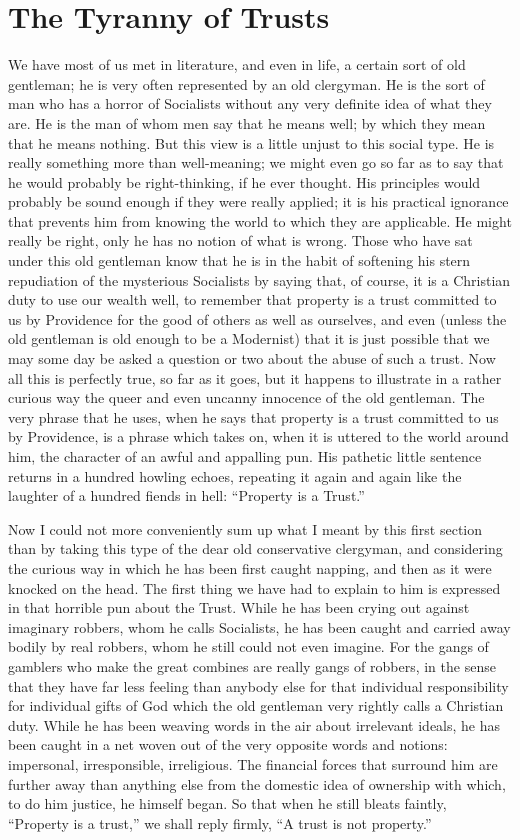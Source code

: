 \documentclass{book}
\begin{document}
\chapter{The Tyranny of Trusts}
\label{chapter-9}
We have most of us met in literature, and even in life, a certain sort of old gentleman; he is very often represented by an old clergyman. He is the sort of man who has a horror of Socialists without any very definite idea of what they are. He is the man of whom men say that he means well; by which they mean that he means nothing. But this view is a little unjust to this social type. He is really something more than well-meaning; we might even go so far as to say that he would probably be right-thinking, if he ever thought. His principles would probably be sound enough if they were really applied; it is his practical ignorance that prevents him from knowing the world to which they are applicable. He might really be right, only he has no notion of what is wrong. Those who have sat under this old gentleman know that he is in the habit of softening his stern repudiation of the mysterious Socialists by saying that, of course, it is a Christian duty to use our wealth well, to remember that property is a trust committed to us by Providence for the good of others as well as ourselves, and even (unless the old gentleman is old enough to be a Modernist) that it is just possible that we may some day be asked a question or two about the abuse of such a trust. Now all this is perfectly true, so far as it goes, but it happens to illustrate in a rather curious way the queer and even uncanny innocence of the old gentleman. The very phrase that he uses, when he says that property is a trust committed to us by Providence, is a phrase which takes on, when it is uttered to the world around him, the character of an awful and appalling pun. His pathetic little sentence returns in a hundred howling echoes, repeating it again and again like the laughter of a hundred fiends in hell: “Property is a Trust.”

Now I could not more conveniently sum up what I meant by this first section than by taking this type of the dear old conservative clergyman, and considering the curious way in which he has been first caught napping, and then as it were knocked on the head. The first thing we have had to explain to him is expressed in that horrible pun about the Trust. While he has been crying out against imaginary robbers, whom he calls Socialists, he has been caught and carried away bodily by real robbers, whom he still could not even imagine. For the gangs of gamblers who make the great combines are really gangs of robbers, in the sense that they have far less feeling than anybody else for that individual responsibility for individual gifts of God which the old gentleman very rightly calls a Christian duty. While he has been weaving words in the air about irrelevant ideals, he has been caught in a net woven out of the very opposite words and notions: impersonal, irresponsible, irreligious. The financial forces that surround him are further away than anything else from the domestic idea of ownership with which, to do him justice, he himself began. So that when he still bleats faintly, “Property is a trust,” we shall reply firmly, “A trust is not property.”
\end{document}
